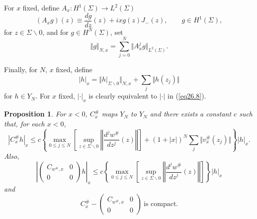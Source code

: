 \documentclass{surv-l}
\theoremstyle{plain}
\newtheorem{prop}[theorem]{Proposition}
\theoremstyle{definition}
\numberwithin{equation}{chapter}
\begin{document}
For $x$ fixed, define $A_{x}:H^{1}(\Sigma)\rightarrow L^{2}(\Sigma)$
\setcounter{equation}{0}
\begin{equation}\label{eq27.1}
(A_{x}g)(z)\equiv\frac{dg}{dz}(z)+ixg(z)J_{-}(z),\qquad g\in H^{1}(\Sigma),
\end{equation}
for $z\in\Sigma\backslash 0$, and for $g\in H^{N}(\Sigma)$, set 
\begin{equation}\label{eq27.2}
\Vert g\Vert_{N,x}=\sum_{j=0}^{N}\Vert A_{x}^{j}g\Vert_{L^{2}(\Sigma)}.
\end{equation}

Finally, for $N,\, x$ fixed, define
\begin{equation}\label{eq27.3}
|h|_{x}=\Vert h|_{\Sigma\backslash 0}\Vert_{N,x}+\sum_{j}\Vert h(z_{j})\Vert
\end{equation}
for $h\in Y_{N}$. For $x$ fixed, $|\cdot |_{x}$ is clearly equivalent to $|\cdot |$ in (\ref{eq26.8}).
\renewcommand\thetheorem{27.\arabic{theorem}}
\setcounter{theorem}{3}
\begin{prop}\label{prop27.4}
For $x<0$, $C_{x}^{\#}$ maps $Y_{N}$ to $Y_{N}$ and there exists a constant $c$ such that, for each $x<0$,
\setcounter{equation}{4}
\begin{equation}\label{eq27.5}
|C_{x}^{\#}h|_{x}\leq c\left\{\max_{0\leq j\leq N}\left[\sup_{z\in\Sigma\backslash 0}\left\Vert\frac{d^{j}w^{\#}}{dz^{j}}(z)\right\Vert\right]+(1+|x|)^{N}\sum_{j}\Vert v_{x}^{\#}(z_{j})\Vert\right\}|h|_{x}.
\end{equation}
Also,
\begin{equation}\label{eq27.6}
\left\vert\left(\begin{array}{cc}
C_{w^{\#},x}& 0\\
0   & 0
\end{array}\right)h\right\vert_{x}\leq c\left\{\max_{0\leq j\leq N}\left[\sup_{z\in\Sigma\backslash 0}\left\Vert\frac{d^{j}w^{\#}}{dz^{j}}(z)\right\Vert\right]\right\}|h|_{x}
\end{equation}
and
\begin{equation}\label{eq27.7}
C_{x}^{\#}- \left(\begin{array}{ccc}
C_{w^{\#},x}   & 0\\
0   & 0
\end{array}\right)\ \text{is compact}.
\end{equation}
\end{prop}
\end{document}
